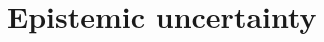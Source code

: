 \documentclass[../main.tex]{subfiles}
\begin{document}
\section{Epistemic uncertainty}
\TODO
\end{document}

